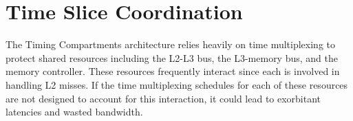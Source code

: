 % 
% 
% 
% 
% 

\section{Time Slice Coordination}
\label{sec:coordination}
The Timing Compartments architecture relies heavily on time multiplexing to 
protect shared resources including the L2-L3 bus, the L3-memory bus, and the 
memory controller. These resources frequently interact since each is involved 
in handling L2 misses. If the time multiplexing schedules for each of these 
resources are not designed to account for this interaction, it could lead to 
exorbitant latencies and wasted bandwidth.

